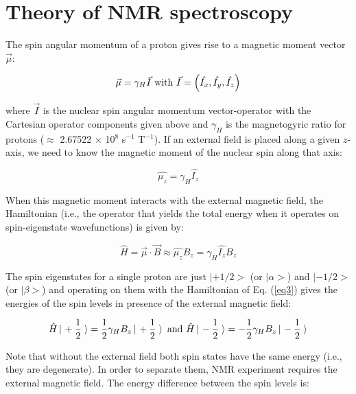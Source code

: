 \documentclass[byrevtex,amssymb,aps,pra,floatfix,letterpaper]{revtex4}
\begin{document}
\section{Theory of NMR spectroscopy}

The spin angular momentum of a proton gives rise to a magnetic moment vector $\vec{\mu}$:

\begin{equation}
\vec{\mu} = \gamma_H\vec{I}\textnormal{ with }\vec{I}=\left(\hat{I_x},\hat{I_y},\hat{I_z}\right)
\label{eq1}
\end{equation}

\noindent
where $\vec{I}$ is the nuclear spin angular momentum vector-operator with the Cartesian operator components given above and $\gamma_H$ is the magnetogyric ratio for protons ($\approx$ 2.67522 $\times$ 10$^8$ s$^{-1}$ T$^{-1}$). If an external field is placed along a given $z$-axis, we need to know the magnetic moment of the nuclear spin along that axis:

\begin{equation}
\hat{\mu_z} = \gamma_H\hat{I_z}
\label{eq2}
\end{equation}

\noindent
When this magnetic moment interacts with the external magnetic field, the Hamiltonian (i.e., the operator that yields the total energy when it operates on spin-eigenstate wavefunctions) is given by:

\begin{equation}
\hat{H} = \vec{\mu}\cdot\vec{B} \approx \hat{\mu_z} B_z = \gamma_H\hat{I_z} B_z
\label{eq3}
\end{equation}

\noindent
The spin eigenstates for a single proton are just $|+1/2>$ (or $|\alpha>$) and $|-1/2>$ (or $|\beta>$) and operating on them with the Hamiltonian of Eq. (\ref{eq3}) gives the energies of the spin levels in presence of the external magnetic field:

\begin{equation}
\hat{H}\left|\right.+\frac{1}{2}\left.\right> = \frac{1}{2}\gamma_H B_z\left|\right.+\frac{1}{2}\left.\right>\textnormal{ and }\hat{H}\left|\right.-\frac{1}{2}\left.\right> = -\frac{1}{2}\gamma_H B_z\left|\right.-\frac{1}{2}\left.\right>
\label{eq4}
\end{equation}

\noindent
Note that without the external field both spin states have the same energy (i.e., they are degenerate). In order to separate them, NMR experiment requires the external magnetic field. The energy difference between the spin levels is:
\end{document}
